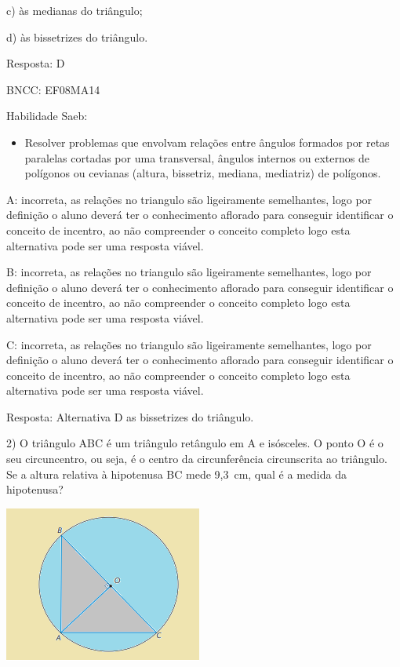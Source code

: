 c) às medianas do triângulo;

d) às bissetrizes do triângulo.

Resposta: D

BNCC: EF08MA14

Habilidade Saeb:

\begin{itemize}
\tightlist
\item
  Resolver problemas que envolvam relações entre ângulos formados por
  retas paralelas cortadas por uma transversal, ângulos internos ou
  externos de polígonos ou cevianas (altura, bissetriz, mediana,
  mediatriz) de polígonos.
\end{itemize}

A: incorreta, as relações no triangulo são ligeiramente semelhantes,
logo por definição o aluno deverá ter o conhecimento aflorado para
conseguir identificar o conceito de incentro, ao não compreender o
conceito completo logo esta alternativa pode ser uma resposta viável.

B: incorreta, as relações no triangulo são ligeiramente semelhantes,
logo por definição o aluno deverá ter o conhecimento aflorado para
conseguir identificar o conceito de incentro, ao não compreender o
conceito completo logo esta alternativa pode ser uma resposta viável.

C: incorreta, as relações no triangulo são ligeiramente semelhantes,
logo por definição o aluno deverá ter o conhecimento aflorado para
conseguir identificar o conceito de incentro, ao não compreender o
conceito completo logo esta alternativa pode ser uma resposta viável.

Resposta: Alternativa D as bissetrizes do triângulo.

2) O triângulo ABC é um triângulo retângulo em A e isósceles. O ponto O
é o seu circuncentro, ou seja, é o centro da circunferência circunscrita
ao triângulo. Se a altura relativa à hipotenusa BC mede 9,3~cm, qual é a
medida da hipotenusa?

\includegraphics[width=2.5625in,height=2.02083in]{./imgSAEB_8_MAT/media/image35.png}

